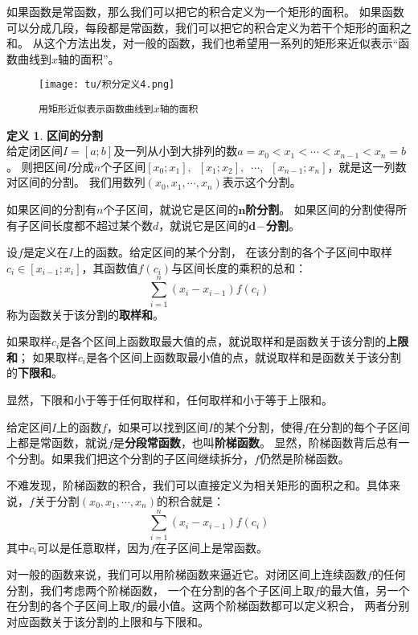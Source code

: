 \documentclass[12pt,UTF8]{ctexbook}
\newcommand{\dash}{\,–\,}
\theoremstyle{definition}
\newtheorem{df}{定义}[section]
\theoremstyle{plain}
\begin{document}
\begin{appendix}
如果函数是常函数，那么我们可以把它的积合定义为一个矩形的面积。
如果函数可以分成几段，每段都是常函数，我们可以把它的积合定义为若干个矩形的面积之和。
从这个方法出发，对一般的函数，我们也希望用一系列的矩形来近似表示“函数曲线到$x$轴的面积”。

\begin{figure}[h] %
    \vspace{4pt}
    \centering
    \texttt{[image: tu/积分定义4.png]}
    \caption*{\texttt{用矩形近似表示函数曲线到$x$轴的面积}}
\end{figure}

\begin{df}{\textbf{区间的分割}}
    \mbox{} \\
    给定闭区间$I=[a; b]$及一列从小到大排列的数$a = x_0 < x_1 < \cdots < x_{n-1} < x_n = b$。
    则把区间$I$分成$n$个子区间$[x_0; x_1], \,\,\, [x_1; x_2], \,\,\,\cdots, \,\,\,[x_{n-1}; x_n]$，就是这一列数对区间的分割。
    我们用数列$(x_0, x_1, \cdots, x_n)$表示这个分割。

    如果区间的分割有$n$个子区间，就说它是区间的$\boldsymbol{n}$\textbf{阶分割}。
    如果区间的分割使得所有子区间长度都不超过某个数$d$，就说它是区间的$\boldsymbol{d}$\textbf{\dash 分割}。

    设$f$是定义在$I$上的函数。给定区间的某个分割，
    在该分割的各个子区间中取样$c_i\in [x_{i-1}; x_{i}]$，其函数值$f(c_i)$与区间长度的乘积的总和：
    $$ \sum_{i=1}^n (x_i - x_{i-1}) f(c_i) $$
    称为函数关于该分割的\textbf{取样和}。

    如果取样$c_i$是各个区间上函数取最大值的点，就说取样和是函数关于该分割的\textbf{上限和}；
    如果取样$c_i$是各个区间上函数取最小值的点，就说取样和是函数关于该分割的\textbf{下限和}。

    显然，下限和小于等于任何取样和，任何取样和小于等于上限和。

\end{df}

给定区间$I$上的函数$f$，如果可以找到区间$I$的某个分割，使得$f$在分割的每个子区间上都是常函数，就说$f$是\textbf{分段常函数}，也叫\textbf{阶梯函数}。
显然，阶梯函数背后总有一个分割。如果我们把这个分割的子区间继续拆分，$f$仍然是阶梯函数。

不难发现，阶梯函数的积合，我们可以直接定义为相关矩形的面积之和。具体来说，$f$关于分割$(x_0, x_1, \cdots, x_n)$的积合就是：
$$ \sum_{i=1}^n (x_i - x_{i-1}) f(c_i) $$
其中$c_i$可以是任意取样，因为$f$在子区间上是常函数。

对一般的函数来说，我们可以用阶梯函数来逼近它。对闭区间上连续函数$f$的任何分割，我们考虑两个阶梯函数，
一个在分割的各个子区间上取$f$的最大值，另一个在分割的各个子区间上取$f$的最小值。这两个阶梯函数都可以定义积合，
两者分别对应函数关于该分割的上限和与下限和。


\end{appendix}
\end{document}
